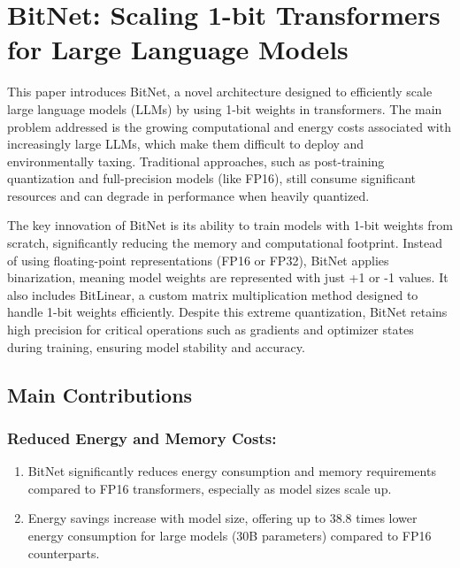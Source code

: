 \documentclass{report}
\begin{document}
	
	
	
	
	
	
	
	
	\chapter{BitNet: Scaling 1-bit Transformers for Large Language Models \cite{wang2023bitnetscaling1bittransformers}}
	
	This paper introduces BitNet, a novel architecture designed to efficiently scale large language models (LLMs) by using 1-bit weights in transformers. The main problem addressed is the growing computational and energy costs associated with increasingly large LLMs, which make them difficult to deploy and environmentally taxing. Traditional approaches, such as post-training quantization and full-precision models (like FP16), still consume significant resources and can degrade in performance when heavily quantized.
	
	
	The key innovation of BitNet is its ability to train models with 1-bit weights from scratch, significantly reducing the memory and computational footprint. Instead of using floating-point representations (FP16 or FP32), BitNet applies binarization, meaning model weights are represented with just +1 or -1 values. It also includes BitLinear, a custom matrix multiplication method designed to handle 1-bit weights efficiently. Despite this extreme quantization, BitNet retains high precision for critical operations such as gradients and optimizer states during training, ensuring model stability and accuracy.
	
	\section{Main Contributions}
	\subsection{Reduced Energy and Memory Costs:}
	\begin{enumerate}
		\item 
		BitNet significantly reduces energy consumption and memory requirements compared to FP16 transformers, especially as model sizes scale up.
		
		\item 
		Energy savings increase with model size, offering up to 38.8 times lower energy consumption for large models (30B parameters) compared to FP16 counterparts.
	\end{enumerate}
	
\end{document}
